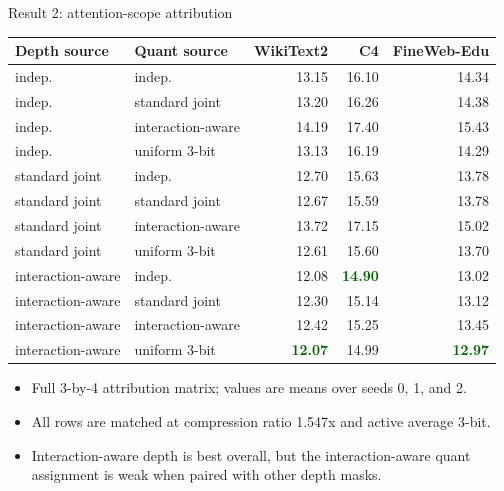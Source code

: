 \documentclass[aspectratio=169]{beamer}
\newcommand{\good}[1]{\textcolor{darkgreen}{\textbf{#1}}}
\begin{document}
\begin{frame}{Result 2: attention-scope attribution}
\scriptsize
\begin{table}
\centering
\setlength{\tabcolsep}{3.5pt}
\begin{tabular}{llrrr}
\toprule
Depth source & Quant source & WikiText2 & C4 & FineWeb-Edu \\
\midrule
indep. & indep. & 13.15 & 16.10 & 14.34 \\
indep. & standard joint & 13.20 & 16.26 & 14.38 \\
indep. & interaction-aware & 14.19 & 17.40 & 15.43 \\
indep. & uniform 3-bit & 13.13 & 16.19 & 14.29 \\
\midrule
standard joint & indep. & 12.70 & 15.63 & 13.78 \\
standard joint & standard joint & 12.67 & 15.59 & 13.78 \\
standard joint & interaction-aware & 13.72 & 17.15 & 15.02 \\
standard joint & uniform 3-bit & 12.61 & 15.60 & 13.70 \\
\midrule
interaction-aware & indep. & 12.08 & \good{14.90} & 13.02 \\
interaction-aware & standard joint & 12.30 & 15.14 & 13.12 \\
interaction-aware & interaction-aware & 12.42 & 15.25 & 13.45 \\
interaction-aware & uniform 3-bit & \good{12.07} & 14.99 & \good{12.97} \\
\bottomrule
\end{tabular}
\end{table}

\vspace{-0.05cm}
\begin{itemize}
    \item Full 3-by-4 attribution matrix; values are means over seeds 0, 1, and 2.
    \item All rows are matched at compression ratio 1.547x and active average 3-bit.
    \item Interaction-aware depth is best overall, but the interaction-aware quant assignment is weak when paired with other depth masks.
\end{itemize}
\end{frame}

\end{document}
